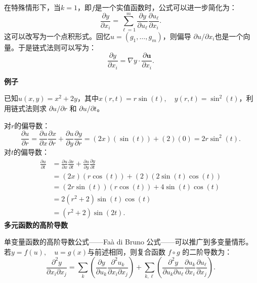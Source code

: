 在特殊情形下，当$k = 1$，即$f$是一个实值函数时，公式可以进一步简化为：
$$
\frac{\partial y}{\partial x_i} 
= \sum_{\ell=1}^m \frac{\partial y}{\partial u_\ell} \frac{\partial u_\ell}{\partial x_i}.~
$$
这可以改写为一个点积形式。回忆$u = (g_1, \dots, g_m)$，则偏导 $\partial u / \partial x_i$也是一个向量。于是链式法则可以写为：
$$
\frac{\partial y}{\partial x_i} = \nabla y \cdot \frac{\partial \mathbf{u}}{\partial x_i}.~
$$

\textbf{例子}

已知$u(x, y) = x^2 + 2y$，其中$x(r, t) = r \sin(t), \quad y(r, t) = \sin^2(t)$，利用链式法则求 $\partial u/\partial r$ 和 $\partial u/\partial t$。

对$r$的偏导数：
$$
\frac{\partial u}{\partial r} 
= \frac{\partial u}{\partial x}\frac{\partial x}{\partial r} + \frac{\partial u}{\partial y}\frac{\partial y}{\partial r}
= (2x)(\sin(t)) + (2)(0)
= 2r\sin^2(t).~
$$
对$t$的偏导数：
$$
\begin{aligned}
\frac{\partial u}{\partial t} 
&= \frac{\partial u}{\partial x}\frac{\partial x}{\partial t} + \frac{\partial u}{\partial y}\frac{\partial y}{\partial t} \\
&= (2x)(r\cos(t)) + (2)(2\sin(t)\cos(t)) \\
&= (2r\sin(t))(r\cos(t)) + 4\sin(t)\cos(t) \\
&= 2(r^2+2)\sin(t)\cos(t) \\
&= (r^2+2)\sin(2t).
\end{aligned}~
$$
\textbf{多元函数的高阶导数}

单变量函数的高阶导数公式——Faà di Bruno 公式——可以推广到多变量情形。若$y = f(u), \quad u = g(x)$与前述相同，则复合函数 $f \circ g$ 的二阶导数为：
$$
\frac{\partial^2 y}{\partial x_i \partial x_j}
= \sum_{k} \left( \frac{\partial y}{\partial u_k} \frac{\partial^2 u_k}{\partial x_i \partial x_j} \right)
+ \sum_{k,\ell} \left( \frac{\partial^2 y}{\partial u_k \partial u_\ell} \frac{\partial u_k}{\partial x_i} \frac{\partial u_\ell}{\partial x_j} \right).~
$$
